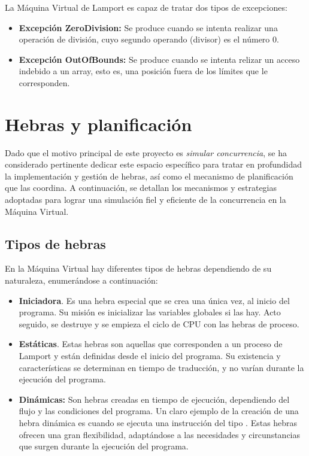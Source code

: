 \noindent
La Máquina Virtual de Lamport es capaz de tratar dos tipos de excepciones:
\begin{itemize}
    \item \textbf{Excepción ZeroDivision:} Se produce cuando se intenta realizar una operación de división, cuyo segundo operando (divisor) es el número 0.
    \item \textbf{Excepción OutOfBounds:} Se produce cuando se intenta relizar un acceso indebido a un array, esto es, una posición fuera de los límites que le corresponden.
\end{itemize}

\section{Hebras y planificación}
Dado que el motivo principal de este proyecto es \textit{simular concurrencia}, se ha considerado pertinente dedicar este espacio específico para tratar en profundidad la implementación y gestión de hebras, así como el mecanismo de planificación que las coordina. A continuación, se detallan los mecanismos y estrategias adoptadas para lograr una simulación fiel y eficiente de la concurrencia en la Máquina Virtual.

\subsection{Tipos de hebras}
En la Máquina Virtual hay diferentes tipos de hebras dependiendo de su naturaleza, enumerándose a continuación:

\begin{itemize}
    \item \textbf{Iniciadora}. Es una hebra especial que se crea una única vez, al inicio del programa. Su misión es inicializar las variables globales si las hay. Acto seguido, se destruye y se empieza el ciclo de CPU con las hebras de proceso.
    \item \textbf{Estáticas}. Estas hebras son aquellas que corresponden a un proceso de Lamport y están definidas desde el inicio del programa. Su existencia y características se determinan en tiempo de traducción, y no varían durante la ejecución del programa.
    \item \textbf{Dinámicas:} Son hebras creadas en tiempo de ejecución, dependiendo del flujo y las condiciones del programa. Un claro ejemplo de la creación de una hebra dinámica es cuando se ejecuta una instrucción del tipo . Estas hebras ofrecen una gran flexibilidad, adaptándose a las necesidades y circunstancias que surgen durante la ejecución del programa.
\end{itemize}

